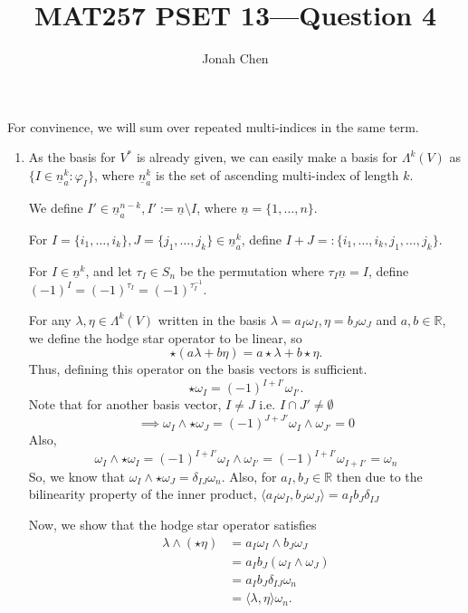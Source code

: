\documentclass{exam}
\title{MAT257 PSET 13---Question 4}
\author{Jonah Chen}
\date{}
\numberwithin{equation}{section}
\newcommand{\R}{\mathbb{R}}
\begin{document}
    \sffamily
    \maketitle
    For convinence, we will sum over repeated multi-indices in the same term.

    \begin{enumerate}[label=\alph*)]
        \item As the basis for \(V^*\) is already given, we can easily make a basis for \(\Lambda^k(V)\) as \(\{I\in\underline{n}_a^k: \varphi_I\}\), where $\underline{n}_a^k$ is the set of ascending multi-index of length $k$.
        
        We define \(I'\in\underline{n}_a^{n-k}, I':=\underline{n}\setminus I\), where $\underline{n}=\{1,\ldots,n\}$. 
        
        For \(I=\{i_1,\dots,i_k\},J=\{j_1,\dots,j_k\}\in\underline{n}_a^{k}\), define \(I+J=:\{i_1,\dots,i_k,j_1,\dots,j_k\}\).

        For \(I\in \underline{n}^k\), and let \(\tau_I\in S_n\) be the permutation where \(\tau_I\underline{n}=I\), define \((-1)^{I}=(-1)^{\tau_I}=(-1)^{\tau_I^{-1}}\).

        For any \(\lambda,\eta\in\Lambda^k(V)\) written in the basis \(\lambda=a_I\omega_I,\eta=b_J\omega_J\) and \(a,b\in\R\), we define the hodge star operator to be linear, so \[
        \star(a\lambda+b\eta)=a\star\lambda+b\star\eta.
        \]
        Thus, defining this operator on the basis vectors is sufficient. \[
            \star\omega_I=(-1)^{I+I'}\omega_{I'}.
        \]
        Note that for another basis vector, \(I\neq J\) i.e. \(I\cap J'\neq\emptyset\)\[
            \implies\omega_I\wedge\star\omega_J=(-1)^{J+J'}\omega_I\wedge\omega_{J'}=0
        \]
        Also,\[
            \omega_I\wedge\star\omega_I=(-1)^{I+I'}\omega_I\wedge\omega_{I'}=(-1)^{I+I'}\omega_{I+I'}=\omega_n
        \]
        So, we know that \(\omega_I\wedge\star\omega_J=\delta_{IJ}\omega_n\). Also, for \(a_I,b_J\in\R\) then due to the bilinearity property of the inner product, \(\langle a_I\omega_I,b_J\omega_J\rangle=a_Ib_J\delta_{IJ}\)

        Now, we show that the hodge star operator satisfies
        \begin{align*}
            \lambda\wedge(\star\eta)&=a_I\omega_I\wedge b_J\omega_J\\
            &=a_Ib_J(\omega_I\wedge\omega_J)\\
            &=a_Ib_J\delta_{IJ}\omega_n\\
            &=\langle\lambda,\eta\rangle\omega_n.
        \end{align*}
        

\end{enumerate}
\end{document}
